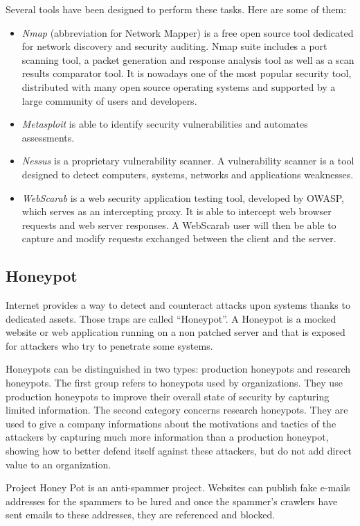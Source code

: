 Several tools have been designed to perform these tasks.
Here are some of them:
\begin{itemize}
\item \textit{Nmap} (abbreviation for Network Mapper) is a free open source tool
	dedicated for network discovery and security auditing. Nmap suite includes
	a port scanning tool, a packet generation and response analysis tool as
	well as a scan results comparator tool.  It is nowadays one of the most
	popular security tool, distributed with many open source operating systems
	and supported by a large community of users and developers.
\item \textit{Metasploit} is able to identify security vulnerabilities and
	automates assessments.
\item \textit{Nessus} is a proprietary vulnerability scanner. A vulnerability
	scanner is a tool designed to detect computers, systems, networks and
	applications weaknesses.
\item \textit{WebScarab} is a web security application testing tool, developed
	by OWASP, which serves as an intercepting proxy.
	It is able to intercept web browser requests and web server
	responses. A WebScarab user will then be able to capture and modify
	requests exchanged between the client and the server.
\end{itemize}

\subsection{Honeypot}

Internet provides a way to detect and counteract attacks upon systems thanks to
dedicated assets. Those traps are called ``Honeypot''. A Honeypot is a mocked
website or web application running on a non patched server and that is exposed
for attackers who try to penetrate some systems.

Honeypots can be distinguished in two types: production honeypots and research
honeypots. The first group refers to honeypots used by organizations. They use
production honeypots to improve their overall state of security by capturing
limited information. The second category concerns research honeypots. They are
used to give a company informations about the motivations and tactics of the
attackers by capturing much more information than a production honeypot,
showing how to better defend itself against these attackers, but do not add
direct value to an organization.

Project Honey Pot is an anti-spammer project. Websites can publish fake e-mails addresses for the spammers to be lured and once the spammer's crawlers have sent emails to these addresses, they are referenced and blocked. 

